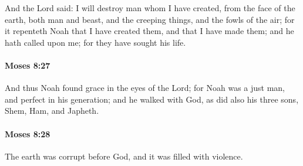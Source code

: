 			And the Lord said: I will destroy man whom I have created, from the face of the earth, both man and beast, and the creeping things, and the fowls of the air; for it repenteth Noah that I have created them, and that I have made them; and he hath called upon me; for they have sought his life.


		\paragraph{Moses 8:27} %
			\label{MOSES-8-27}

			And thus Noah found grace in the eyes of the Lord; for Noah was a just man, and perfect in his generation; and he walked with God, as did also his three sons, Shem, Ham, and Japheth.


		\paragraph{Moses 8:28} %
			\label{MOSES-8-28}

			The earth was corrupt before God, and it was filled with violence.


